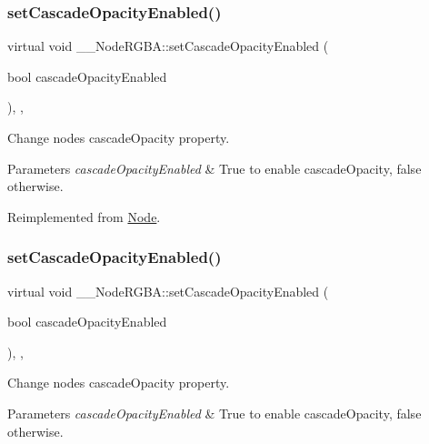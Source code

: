 \subsubsection{\texorpdfstring{set\+Cascade\+Opacity\+Enabled()}{setCascadeOpacityEnabled()}\hspace{0.1cm}{\footnotesize\ttfamily [1/2]}}
{\footnotesize\ttfamily virtual void \+\_\+\+\_\+\+Node\+R\+G\+B\+A\+::set\+Cascade\+Opacity\+Enabled (\begin{DoxyParamCaption}\item[{bool}]{cascade\+Opacity\+Enabled }\end{DoxyParamCaption})\hspace{0.3cm}{\ttfamily [inline]}, {\ttfamily [override]}, {\ttfamily [virtual]}}

Change node\textquotesingle{}s cascade\+Opacity property. 
\begin{DoxyParams}{Parameters}
{\em cascade\+Opacity\+Enabled} & True to enable cascade\+Opacity, false otherwise. \\
\hline
\end{DoxyParams}


Reimplemented from \hyperlink{classNode_a56b08f1d19bb0345f6fb40d9a3e3b4a4}{Node}.

\mbox{\label{class____NodeRGBA_a10fe85e705700fbe2bd28da1a17eda68}} 
\subsubsection{\texorpdfstring{set\+Cascade\+Opacity\+Enabled()}{setCascadeOpacityEnabled()}\hspace{0.1cm}{\footnotesize\ttfamily [2/2]}}
{\footnotesize\ttfamily virtual void \+\_\+\+\_\+\+Node\+R\+G\+B\+A\+::set\+Cascade\+Opacity\+Enabled (\begin{DoxyParamCaption}\item[{bool}]{cascade\+Opacity\+Enabled }\end{DoxyParamCaption})\hspace{0.3cm}{\ttfamily [inline]}, {\ttfamily [override]}, {\ttfamily [virtual]}}

Change node\textquotesingle{}s cascade\+Opacity property. 
\begin{DoxyParams}{Parameters}
{\em cascade\+Opacity\+Enabled} & True to enable cascade\+Opacity, false otherwise. \\
\hline
\end{DoxyParams}


